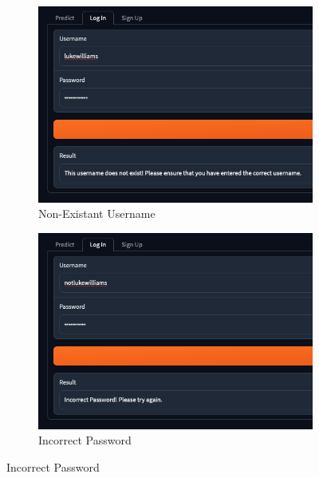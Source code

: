 \documentclass[12pt]{report}
\begin{document}
\begin{figure}[H]
\centering
\begin{subfigure}{.45\linewidth}
    \centering
    \includegraphics[width=\linewidth]{ss16.1a.png}
    \caption{Non-Existant Username}
\end{subfigure}
\begin{subfigure}{.45\linewidth}
    \centering
    \includegraphics[width=\linewidth]{ss16.1b.png}
    \caption{Incorrect Password}
\end{subfigure}


\end{figure}
\end{document}
